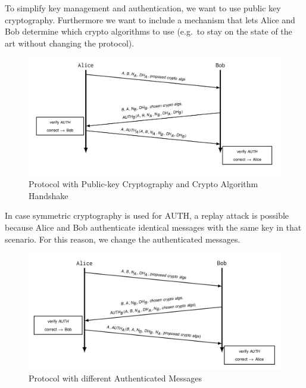 To simplify key management and authentication, we want to use public key cryptography.
Furthermore we want to include a mechanism that lets Alice and Bob determine which crypto algorithms to use (e.g.\ to stay on the state of the art without changing the protocol).
\begin{figure}[H]
  \centering
  \includegraphics[width=\textwidth]{figures/ooppt5.png}
  \caption{Protocol with Public-key Cryptography and Crypto Algorithm Handshake}\label{fig:ooppt5}
\end{figure}

In case symmetric cryptography is used for AUTH, a replay attack is possible because Alice and Bob authenticate identical messages with the same key in that scenario.
For this reason, we change the authenticated messages.
\begin{figure}[H]
  \centering
  \includegraphics[width=\textwidth]{figures/ooppt6.png}
  \caption{Protocol with different Authenticated Messages}\label{fig:ooppt6}
\end{figure}
\newpage


